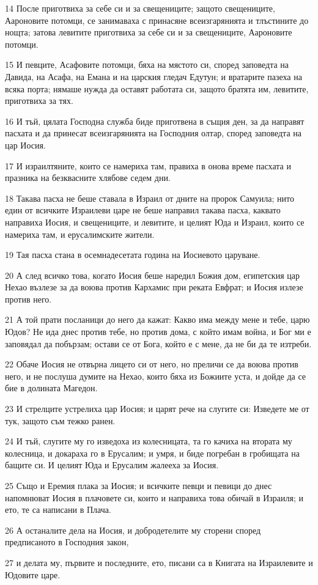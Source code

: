 \par 14 После приготвиха за себе си и за свещениците; защото свещениците, Аароновите потомци, се занимаваха с принасяне всеизгарянията и тлъстините до нощта; затова левитите приготвиха за себе си и за свещениците, Аароновите потомци.
\par 15 И певците, Асафовите потомци, бяха на мястото си, според заповедта на Давида, на Асафа, на Емана и на царския гледач Едутун; и вратарите пазеха на всяка порта; нямаше нужда да оставят работата си, защото братята им, левитите, приготвиха за тях.
\par 16 И тъй, цялата Господна служба биде приготвена в същия ден, за да направят пасхата и да принесат всеизгарянията на Господния олтар, според заповедта на цар Иосия.
\par 17 И израилтяните, които се намериха там, правиха в онова време пасхата и празника на безквасните хлябове седем дни.
\par 18 Такава пасха не беше ставала в Израил от дните на пророк Самуила; нито един от всичките Израилеви царе не беше направил такава пасха, каквато направиха Иосия, и свещениците, и левитите, и целият Юда и Израил, които се намериха там, и ерусалимските жители.
\par 19 Тая пасха стана в осемнадесетата година на Иосиевото царуване.
\par 20 А след всичко това, когато Иосия беше наредил Божия дом, египетския цар Нехао възлезе за да воюва против Кархамис при реката Евфрат; и Иосия излезе против него.
\par 21 А той прати посланици до него да кажат: Какво има между мене и тебе, царю Юдов? Не ида днес против тебе, но против дома, с който имам война, и Бог ми е заповядал да побързам; остави се от Бога, който е с мене, да не би да те изтреби.
\par 22 Обаче Иосия не отвърна лицето си от него, но преличи се да воюва против него, и не послуша думите на Нехао, които бяха из Божиите уста, и дойде да се бие в долината Магедон.
\par 23 И стрелците устрелиха цар Иосия; и царят рече на слугите си: Изведете ме от тук, защото съм тежко ранен.
\par 24 И тъй, слугите му го изведоха из колесницата, та го качиха на втората му колесница, и докараха го в Ерусалим; и умря, и биде погребан в гробищата на бащите си. И целият Юда и Ерусалим жалееха за Иосия.
\par 25 Също и Еремия плака за Иосия; и всичките певци и певици до днес напомнюват Иосия в плачовете си, които и направиха това обичай в Израиля; и ето, те са написани в Плача.
\par 26 А останалите дела на Иосия, и добродетелите му сторени според предписаното в Господния закон,
\par 27 и делата му, първите и последните, ето, писани са в Книгата на Израилевите и Юдовите царе.

